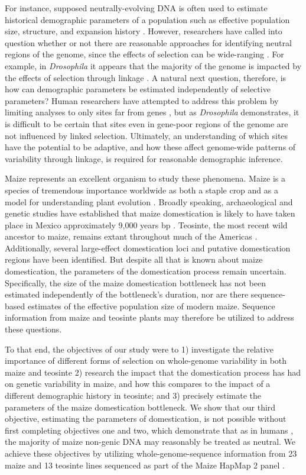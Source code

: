 \documentclass{pnastwo}
\begin{document}
\begin{article}
For instance, supposed neutrally-evolving DNA is often used to estimate historical demographic
parameters of a population such as effective population size, structure, and expansion
history \cite{luikart2003, gutenkunst2009}. However, researchers have
called into question whether or not there are reasonable approaches
for identifying neutral regions of the genome, since the effects of
selection can be wide-ranging \cite{li2012, slotte2014}. For example, in
\emph{Drosophila} it appears that the majority of the genome is
impacted by the effects of selection through linkage
\cite{sella2009}. A natural next question, therefore, is how can
demographic parameters be estimated independently of
selective parameters? Human researchers have attempted to address this
problem by limiting analyses to only sites far from genes
\cite{gazave2014}, but as \emph{Drosophila} demonstrates, it is
difficult to be certain that sites even in gene-poor regions of the
genome are not influenced by linked selection. Ultimately, an understanding
of which sites have the potential to be adaptive, and how these affect
genome-wide patterns of variability through linkage, is required for
reasonable demographic inference.

Maize represents an excellent organism to study these
phenomena. Maize is a species of tremendous importance worldwide as
both a staple crop \cite{shiferaw2011} and as a model for
understanding plant evolution \cite{strable2009}. Broadly speaking, archaeological and genetic studies have
established that maize domestication is likely to have taken place in
 Mexico approximately 9,000 years bp
\cite{smith1995,matsuoka2002}. Teosinte, the most
recent wild ancestor to maize, remains extant throughout much of the
Americas \cite{wilkes1967}. Additionally, several large-effect
domestication loci \cite{doebley1995, wills2013, wang2015} and putative domestication
regions \cite{hufford2012} have been identified. But despite all that is
known about maize domestication, the parameters of the
domestication process remain uncertain. Specifically, the size of the
maize domestication bottleneck has not been estimated independently of
the bottleneck's duration, nor are there sequence-based estimates of the effective
population size of modern maize. Sequence information from maize and
teosinte plants may therefore be utilized to address these questions.

To that end, the objectives of our study were to 1) investigate the
relative importance of different forms of selection on whole-genome
variability in both maize and teosinte 2) research the impact that the
domestication process has had on genetic variability in maize, and how
this compares to the impact of a different demographic history in
teosinte; and 3) precisely estimate the parameters of the
maize domestication bottleneck. We show that our third objective, estimating the
parameters of domestication, is not possible without first completing
 objectives one and two, which demonstrate that as in humans \cite{gazave2014}, the
majority of maize non-genic DNA may reasonably be treated as
neutral. We achieve these objectives by utilizing
whole-genome-sequence information from 23 maize and 13 teosinte lines
sequenced as part of the Maize HapMap 2 panel \cite{chia2012}.



\end{article}
\end{document}
